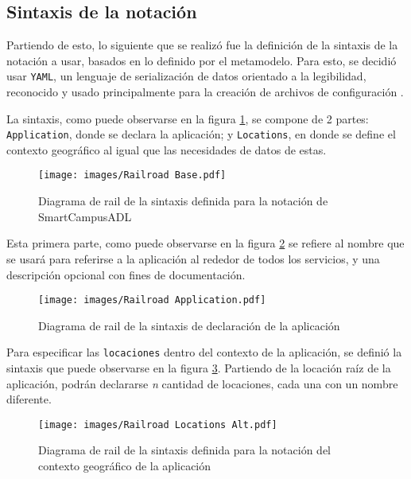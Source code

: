 \subsection{Sintaxis de la notación}

Partiendo de esto, lo siguiente que se realizó fue la definición de la sintaxis de la notación a usar, basados en lo definido por el metamodelo. Para esto, se decidió usar \texttt{YAML}, un lenguaje de serialización de datos orientado a la legibilidad, reconocido y usado principalmente para la creación de archivos de configuración \cite{YAML2023}. 

La sintaxis, como puede observarse en la figura \ref{fig:rail-base}, se compone de 2 partes: \texttt{Application}, donde se declara la aplicación; y \texttt{Locations}, en donde se define el contexto geográfico al igual que las necesidades de datos de estas.

\begin{figure}[H]
    \centering
    \caption{Diagrama de rail de la sintaxis definida para la notación de SmartCampusADL}
    \label{fig:rail-base}
    \vspace{2mm}
    \texttt{[image: images/Railroad Base.pdf]}
\end{figure}

Esta primera parte, como puede observarse en la figura \ref{fig:rail-app} se refiere al nombre que se usará para referirse a la aplicación al rededor de todos los servicios, y una descripción opcional con fines de documentación.

\begin{figure}[H]
    \centering
    \caption{Diagrama de rail de la sintaxis de declaración de la aplicación}
    \label{fig:rail-app}
    \vspace{2mm}
    \texttt{[image: images/Railroad Application.pdf]}
\end{figure}

Para especificar las \texttt{locaciones} dentro del contexto de la aplicación, se definió la sintaxis que puede observarse en la figura \ref{fig:rail-location}. Partiendo de la locación raíz de la aplicación, podrán declararse \textit{n} cantidad de locaciones, cada una con un nombre diferente.

\begin{figure}[H]
    \centering
    \caption{Diagrama de rail de la sintaxis definida para la notación del contexto geográfico de la aplicación}
    \label{fig:rail-location}
    \vspace{-2mm}
    \texttt{[image: images/Railroad Locations Alt.pdf]}
\end{figure}

